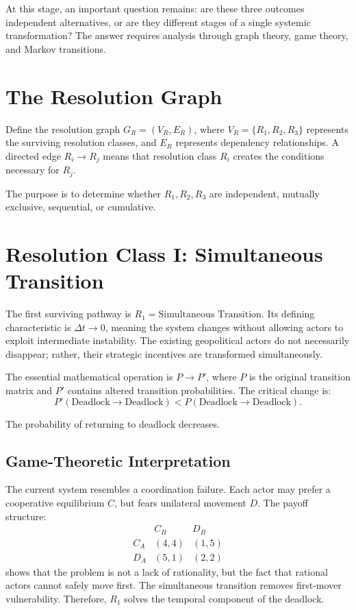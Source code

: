 \documentclass[11pt,openany]{book}
\theoremstyle{plain}
\theoremstyle{definition}
\begin{document}
At this stage, an important question remains: are these three outcomes independent alternatives, or are they different stages of a single systemic transformation? The answer requires analysis through graph theory, game theory, and Markov transitions.

\section*{The Resolution Graph}

Define the resolution graph \(G_R = (V_R, E_R)\), where \(V_R = \{R_1, R_2, R_3\}\) represents the surviving resolution classes, and \(E_R\) represents dependency relationships. A directed edge \(R_i \to R_j\) means that resolution class \(R_i\) creates the conditions necessary for \(R_j\). 

The purpose is to determine whether \(R_1, R_2, R_3\) are independent, mutually exclusive, sequential, or cumulative.

\section*{Resolution Class I: Simultaneous Transition}

The first surviving pathway is \(R_1 = \text{Simultaneous Transition}\). Its defining characteristic is \(\Delta t \to 0\), meaning the system changes without allowing actors to exploit intermediate instability. The existing geopolitical actors do not necessarily disappear; rather, their strategic incentives are transformed simultaneously.

The essential mathematical operation is \(P \to P'\), where \(P\) is the original transition matrix and \(P'\) contains altered transition probabilities. The critical change is:
\[
P'(\text{Deadlock} \to \text{Deadlock}) < P(\text{Deadlock} \to \text{Deadlock}).
\]

The probability of returning to deadlock decreases.

\subsection*{Game-Theoretic Interpretation}

The current system resembles a coordination failure. Each actor may prefer a cooperative equilibrium \(C\), but fears unilateral movement \(D\). The payoff structure:
\[
\begin{array}{c|cc}
& C_B & D_B \\
\hline
C_A & (4, 4) & (1, 5) \\
D_A & (5, 1) & (2, 2)
\end{array}
\]
shows that the problem is not a lack of rationality, but the fact that rational actors cannot safely move first. The simultaneous transition removes first-mover vulnerability. Therefore, \(R_1\) solves the temporal component of the deadlock.
\end{document}
